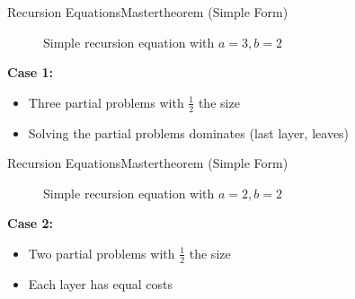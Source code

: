 
\begin{frame}{Recursion Equations}{Mastertheorem (Simple Form)}
  \begin{figure}[!h]
    \begin{adjustbox}{width=\linewidth}
      \def\AlgoREDivide{3}%
      \def\AlgoRESize{0.5}%
      \def\AlgoREScale{4.444}%
      
    \end{adjustbox}
    \caption{Simple recursion equation with {\color{Mittel-Blau}$a = 3, b = 2$}}
    \label{fig:recursion_equations:mastertheorem_tree_3_2}
  \end{figure}
  \textbf{Case 1:}
  \begin{itemize}
    \item
      Three partial problems with $\frac{1}{2}$ the size
    \item
      Solving the partial problems dominates (last layer, leaves)
  \end{itemize}
\end{frame}


\begin{frame}{Recursion Equations}{Mastertheorem (Simple Form)}
  \begin{figure}[!h]
    \begin{adjustbox}{width=\linewidth}
      \def\AlgoREDivide{2}%
      \def\AlgoRESize{0.5}%
      \def\AlgoREScale{15}%
      
    \end{adjustbox}
    \caption{Simple recursion equation with {\color{Mittel-Blau}$a = 2, b = 2$}}
    \label{fig:recursion_equations:mastertheorem_tree_2_2}
  \end{figure}
  \textbf{Case 2:}
  \begin{itemize}
    \item
      Two partial problems with $\frac{1}{2}$ the size
    \item
      Each layer has equal costs
  \end{itemize}
\end{frame}


